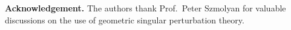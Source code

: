\documentclass[11pt]{article}
\theoremstyle{remark}
\begin{document}
%

\bigskip
\noindent
{\bf Acknowledgement.}
The authors thank {\sc Prof.~Peter Szmolyan} for valuable discussions on the use of geometric singular perturbation theory.
\end{document}
